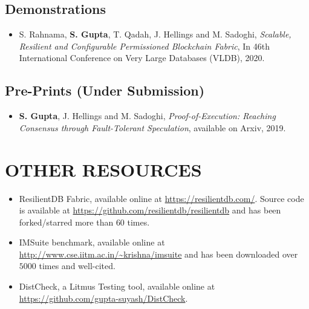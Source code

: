 \documentclass[10pt]{article}
\begin{document}
\subsection*{Demonstrations}
\begin{itemize}
\itemsep-0.2em

\item S. Rahnama, {\bf S. Gupta}, T. Qadah, J. Hellings and M. Sadoghi, {\em Scalable, Resilient and Configurable Permissioned Blockchain Fabric}, In 46th International Conference on Very Large Databases (VLDB), 2020.

\end{itemize}

\subsection*{Pre-Prints (Under Submission)}
\begin{itemize}
\itemsep-0.2em
\item {\bf S. Gupta}, J. Hellings and M. Sadoghi, {\em Proof-of-Execution: Reaching Consensus through Fault-Tolerant Speculation}, available on Arxiv, 2019.
\end{itemize}


\section*{OTHER RESOURCES}
\begin{itemize}
\itemsep-0.2em

\item ResilientDB Fabric, available online at \url{https://resilientdb.com/}. Source code is available at \url{https://github.com/resilientdb/resilientdb} and has been forked/starred more than $60$ times.

\item IMSuite benchmark, available online at \url{http://www.cse.iitm.ac.in/~krishna/imsuite} and has been downloaded over $5000$ times and well-cited.

\item DistCheck, a Litmus Testing tool, available online at \url{https://github.com/gupta-suyash/DistCheck}.

\end{itemize}
\end{document}
